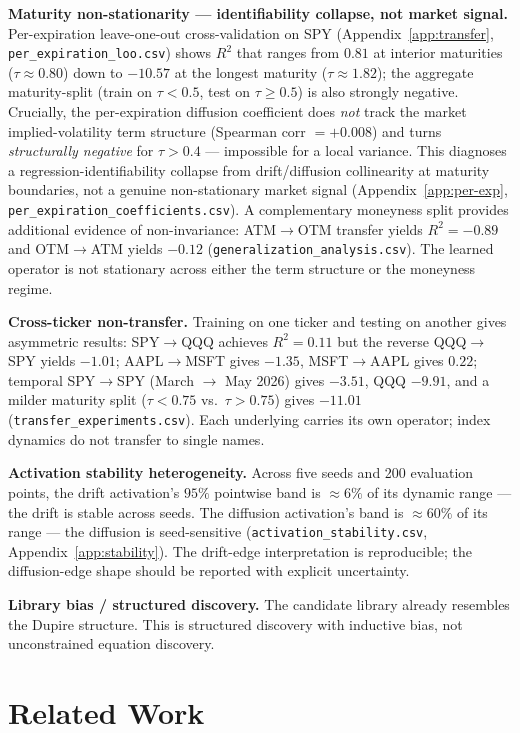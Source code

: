 \documentclass[10pt]{article}
\begin{document}
\textbf{Maturity non-stationarity --- identifiability collapse, not market signal.} Per-expiration leave-one-out cross-validation on SPY (Appendix~\ref{app:transfer}, \texttt{per\_expiration\_loo.csv}) shows $R^2$ that ranges from $0.81$ at interior maturities ($\tau{\approx}0.80$) down to $-10.57$ at the longest maturity ($\tau{\approx}1.82$); the aggregate maturity-split (train on $\tau{<}0.5$, test on $\tau{\ge}0.5$) is also strongly negative. Crucially, the per-expiration diffusion coefficient does \emph{not} track the market implied-volatility term structure (Spearman corr $= +0.008$) and turns \emph{structurally negative} for $\tau > 0.4$ --- impossible for a local variance. This diagnoses a regression-identifiability collapse from drift/diffusion collinearity at maturity boundaries, not a genuine non-stationary market signal (Appendix~\ref{app:per-exp}, \texttt{per\_expiration\_coefficients.csv}). A complementary moneyness split provides additional evidence of non-invariance: ATM$\to$OTM transfer yields $R^2{=}-0.89$ and OTM$\to$ATM yields $-0.12$ (\texttt{generalization\_analysis.csv}). The learned operator is not stationary across either the term structure or the moneyness regime.

\textbf{Cross-ticker non-transfer.} Training on one ticker and testing on another gives asymmetric results: SPY$\to$QQQ achieves $R^2{=}0.11$ but the reverse QQQ$\to$SPY yields $-1.01$; AAPL$\to$MSFT gives $-1.35$, MSFT$\to$AAPL gives $0.22$; temporal SPY$\to$SPY (March $\to$ May 2026) gives $-3.51$, QQQ $-9.91$, and a milder maturity split ($\tau{<}0.75$ vs.\ $\tau{>}0.75$) gives $-11.01$ (\texttt{transfer\_experiments.csv}). Each underlying carries its own operator; index dynamics do not transfer to single names.

\textbf{Activation stability heterogeneity.} Across five seeds and 200 evaluation points, the drift activation's $95\%$ pointwise band is ${\approx}6\%$ of its dynamic range --- the drift is stable across seeds. The diffusion activation's band is ${\approx}60\%$ of its range --- the diffusion is seed-sensitive (\texttt{activation\_stability.csv}, Appendix~\ref{app:stability}). The drift-edge interpretation is reproducible; the diffusion-edge shape should be reported with explicit uncertainty.

\textbf{Library bias / structured discovery.} The candidate library already resembles the Dupire structure. This is structured discovery with inductive bias, not unconstrained equation discovery.

\section{Related Work}
\end{document}
